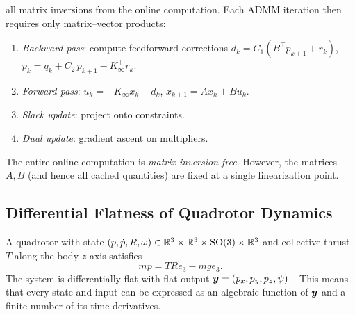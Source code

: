 all matrix inversions from the online computation.
Each ADMM iteration then requires only matrix--vector products:
\begin{enumerate}[label=(\roman*)]
  \item \emph{Backward pass}: compute feedforward corrections
    $d_k = C_1(B^\top p_{k+1} + r_k)$,
    $p_k = q_k + C_2 \, p_{k+1} - K_\infty^\top r_k$.
  \item \emph{Forward pass}: $u_k = -K_\infty x_k - d_k$,
    $x_{k+1} = A x_k + B u_k$.
  \item \emph{Slack update}: project onto constraints.
  \item \emph{Dual update}: gradient ascent on multipliers.
\end{enumerate}

The entire online computation is \emph{matrix-inversion free}.
However, the matrices $A, B$ (and hence all cached quantities)
are fixed at a single linearization point.

\subsection{Differential Flatness of Quadrotor Dynamics}\label{sec:flatness}

A quadrotor with state
$(p, \dot{p}, R, \omega) \in \mathbb{R}^3 \times \mathbb{R}^3 \times \mathrm{SO}(3) \times \mathbb{R}^3$
and collective thrust $T$ along the body $z$-axis satisfies
\begin{equation}\label{eq:trans}
  m \ddot{p} = T R e_3 - m g e_3.
\end{equation}
The system is differentially flat with flat output
$\bm{y} = (p_x, p_y, p_z, \psi)$~\cite{mellinger2011,murray1995}.
This means that every state and input can be expressed as an
algebraic function of $\bm{y}$ and a finite number of its time derivatives.

